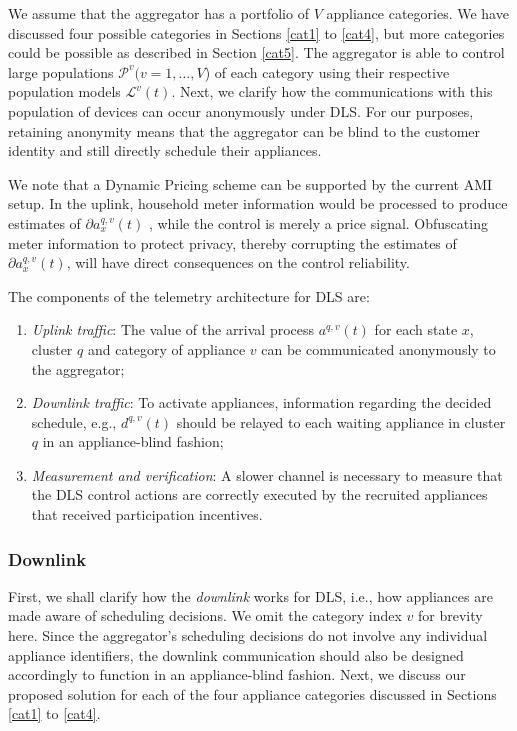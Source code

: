 \documentclass[10pt]{IEEEtran}
\begin{document}
We assume that the aggregator has a portfolio of $V$ appliance categories. We have discussed four possible categories in Sections \ref{cat1} to \ref{cat4}, but more categories could be possible as described in Section \ref{cat5}. The aggregator  is able to control large populations 
${\mathcal P}^v (v=1,\ldots,V$) of each category using their respective population models ${\mathcal L}^v(t)$. Next, we clarify how the communications with this population of devices can occur anonymously under DLS.  For our purposes, retaining anonymity means that the aggregator can be blind to the customer identity and still directly schedule their appliances.   

We note that a Dynamic Pricing scheme can be supported by the current AMI setup. In the uplink, household meter information would be processed to produce estimates of $\partial a_x^{q,v}(t)$ \cite{nlm}, while the control is merely a price signal. Obfuscating meter information to protect privacy, thereby corrupting the estimates of $\partial a_x^{q,v}(t)$, will have direct consequences on the control reliability.


The components of the telemetry architecture for DLS are:
\begin{enumerate}
\item \textit{Uplink  traffic}: The value of the arrival process $a^{q,v}(t)$ for each state $x$, cluster $q$ and category of appliance $v$ can be communicated anonymously to the aggregator; 
\item  \textit{Downlink  traffic}: To activate appliances, information regarding the decided schedule, e.g., $d^{q,v}(t)$ should be relayed to each waiting appliance in cluster $q$ in an appliance-blind fashion;  
\item {\it Measurement and verification}: A slower channel is necessary to measure that the DLS control actions are correctly executed by the recruited appliances that received participation incentives. 
\end{enumerate}



\subsubsection{Downlink} First, we shall clarify how the {\it downlink} works for DLS, i.e., how appliances are made aware of scheduling decisions. We omit the category index $v$ for brevity here.  Since the aggregator's scheduling decisions do not involve any individual appliance identifiers, the downlink communication should also be designed accordingly to function in an appliance-blind fashion. Next, we discuss our proposed solution for each of the four appliance categories discussed in Sections \ref{cat1} to \ref{cat4}.
\end{document}
